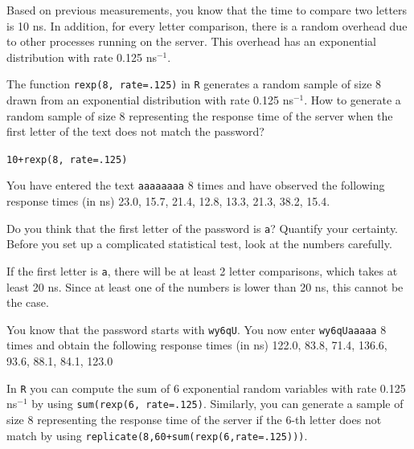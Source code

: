 \documentclass[12pt]{article}
\begin{document}
  Based on previous measurements, you know that the
  time to compare two letters is 10 ns. In addition, for
  every letter comparison, there is a random overhead due
  to other processes running on the server. This overhead
  has an exponential distribution with rate 0.125 ns$^{-1}$.

  \begin{Exercise}[label={exo7}]
  The function \texttt{rexp(8, rate=.125)} in \texttt{R}
  generates a random sample of size 8 drawn from an
  exponential distribution with rate 0.125 ns$^{-1}$.
  How to generate a random sample of size 8 representing
  the response time of the server when the first letter of
  the text does not match the password?
\end{Exercise}
\begin{Answer}[ref={exo7}]
  \texttt{10+rexp(8, rate=.125)}
\end{Answer}

  You have entered the text \texttt{aaaaaaaa} 8 times
  and have observed the following response times (in ns)
  23.0, 15.7, 21.4, 12.8, 13.3, 21.3, 38.2, 15.4.

  \begin{Exercise}[label={exo8}]
  Do you think that the first letter of the password is
  \texttt{a}? Quantify your certainty. Before you set up 
  a complicated statistical test, look at the numbers
  carefully.
\end{Exercise}
\begin{Answer}[ref={exo8}]
  If the first letter is \texttt{a}, there will be at
  least 2 letter comparisons, which takes at least 20 ns.
  Since at least one of the numbers is lower than 20 ns,
  this cannot be the case.
\end{Answer}

  You know that the password starts with \texttt{wy6qU}.
  You now enter \texttt{wy6qUaaaaa} 8 times and obtain
  the following response times (in ns)
  122.0, 83.8, 71.4, 136.6, 93.6, 88.1, 84.1, 123.0

  In \texttt{R} you can compute the sum of 6 exponential
  random variables with rate 0.125 ns$^{-1}$ by using
  \texttt{sum(rexp(6, rate=.125)}. Similarly, you can
  generate a sample of size 8 representing the response
  time of the server if the 6-th letter does not match
  by using \texttt{replicate(8,60+sum(rexp(6,rate=.125)))}.
\end{document}
